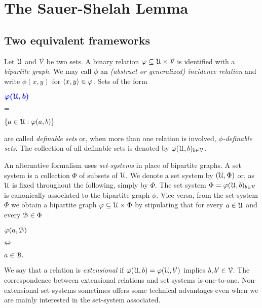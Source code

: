 \documentclass[sputnik.tex]{subfiles}
\begin{document}
\chapter{The Sauer-Shelah Lemma}
\label{sauer}

\def\vc{{\footnotesize VC}}
\def\nip{{\footnotesize NIP}}


\def\medrel#1{\parbox[t]{6ex}{$\displaystyle\hfil #1$}}
\def\ceq#1#2#3{\parbox[t]{22ex}{$\displaystyle #1$}\medrel{#2}{$\displaystyle #3$}}

\def\mr{\color{brown}}
\def\gr{\color{green}}

\def\separatore{\hfil o \rule[0.5ex]{4ex}{0.1ex} o \rule[0.5ex]{4ex}{0.1ex} o}

\section{Two equivalent frameworks}\label{vc_dimension}

Let $\EuScript U$ and $\EuScript V$ be two sets. 
A binary relation $\varphi\subseteq \EuScript U\times\EuScript V$ is identified with a \emph{bipartite graph}.
We may call $\phi$ an \emph{(abstract or generalized) incidence relation\/} and write $\phi(x,y)$ for $\langle x,y\rangle\in\varphi$.
Sets of the form

\ceq{\hfill\emph{$\phi(\U,b)$}}{=}{\{a\in\U:\phi(a,b)\}}

are called \emph{definable sets\/} or, when more than one relation is involved, \emph{$\phi$-definable sets}.
The collection of all definable sets is denoted by \emph{$\varphi(\EuScript U,b)_{b\in\EuScript V}$}.

An alternative formalism uses \emph{set-systems\/} in place of bipartite graphs.
A set system is a collection $\Phi$ of subsets of $\EuScript U$.
We denote a set system by \emph{$(\EuScript U,\Phi)$} or, as $\EuScript U$ is fixed throughout the following, simply by \emph{$\Phi$}.
The set system $\Phi=\varphi(\EuScript U,b)_{b\in\EuScript V}$ is canonically associated to the bipartite graph $\phi$.
Vice versa, from the set-system $\Phi$ we obtain a bipartite graph $\varphi\subseteq\EuScript U\times\Phi$ by stipulating that for every $a\in\EuScript U$ and every $\EuScript B\in\Phi$ 

\ceq{\hfill\phi(a,\B)}{\IFF}{a\in\B.}

We say that a relation is \emph{extensional\/} if $\varphi(\EuScript U,b)=\varphi(\EuScript U,b')$ implies $b,b'\in\EuScript V$.
The correspondence between extensional relations and set systems is one-to-one.
Non-extensional set-systems sometimes offers some technical advantages even when we are mainly interested in the set-system associated.
\end{document}
